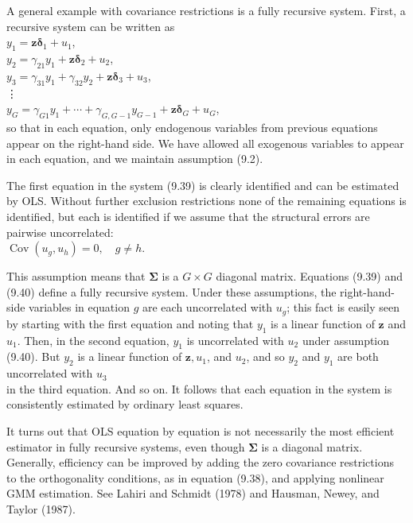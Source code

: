 \documentclass[10pt]{article}
\begin{document}
A general example with covariance restrictions is a fully recursive system. First, a recursive system can be written as\\
$y_{1}=\mathbf{z} \boldsymbol{\delta}_{1}+u_{1}$,\\
$y_{2}=\gamma_{21} y_{1}+\mathbf{z} \boldsymbol{\delta}_{2}+u_{2}$,\\
$y_{3}=\gamma_{31} y_{1}+\gamma_{32} y_{2}+\mathbf{z} \boldsymbol{\delta}_{3}+u_{3}$,\\
⋮\\
$y_{G}=\gamma_{G 1} y_{1}+\cdots+\gamma_{G, G-1} y_{G-1}+\mathbf{z} \boldsymbol{\delta}_{G}+u_{G}$,\\
so that in each equation, only endogenous variables from previous equations appear on the right-hand side. We have allowed all exogenous variables to appear in each equation, and we maintain assumption (9.2).

The first equation in the system (9.39) is clearly identified and can be estimated by OLS. Without further exclusion restrictions none of the remaining equations is identified, but each is identified if we assume that the structural errors are pairwise uncorrelated:\\
$\operatorname{Cov}\left(u_{g}, u_{h}\right)=0, \quad g \neq h$.

This assumption means that $\boldsymbol{\Sigma}$ is a $G \times G$ diagonal matrix. Equations (9.39) and (9.40) define a fully recursive system. Under these assumptions, the right-hand-side variables in equation $g$ are each uncorrelated with $u_{g}$; this fact is easily seen by starting with the first equation and noting that $y_{1}$ is a linear function of $\mathbf{z}$ and $u_{1}$. Then, in the second equation, $y_{1}$ is uncorrelated with $u_{2}$ under assumption (9.40). But $y_{2}$ is a linear function of $\mathbf{z}, u_{1}$, and $u_{2}$, and so $y_{2}$ and $y_{1}$ are both uncorrelated with $u_{3}$\\
in the third equation. And so on. It follows that each equation in the system is consistently estimated by ordinary least squares.

It turns out that OLS equation by equation is not necessarily the most efficient estimator in fully recursive systems, even though $\boldsymbol{\Sigma}$ is a diagonal matrix. Generally, efficiency can be improved by adding the zero covariance restrictions to the orthogonality conditions, as in equation (9.38), and applying nonlinear GMM estimation. See Lahiri and Schmidt (1978) and Hausman, Newey, and Taylor (1987).
\end{document}
